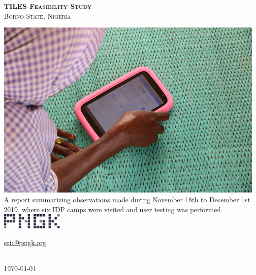\begin{titlepage}
\centering

	\textsc{\textbf{\huge{TILES Feasibility Study}}} \\[0.25 cm]
	\textsc{\huge{Borno State, Nigeria }}\\[0.25 cm]
	\vspace*{1\baselineskip}
	
	\includegraphics[width=16cm, scale=0.25]{images/woman_using_TILES.JPG} \\[1cm]

	\Large{A report summarizing observations made during November 18th to December 1st 2019, where six IDP camps were visited and user testing was performed.} \\[2 cm]
	

	\href{https://www.pngk.org/}{\textsc{\includegraphics[width=3cm]{images/PNGK_logo.png}}} \\[0.15cm]
	

	\noindent
    \begin{minipage}[b]{.5\textwidth}
        \centering
        \href{mailto:eric@pngk.org}{eric@pngk.org}
    \end{minipage}%
	\\[2.5cm]
	
	\today

\end{titlepage}